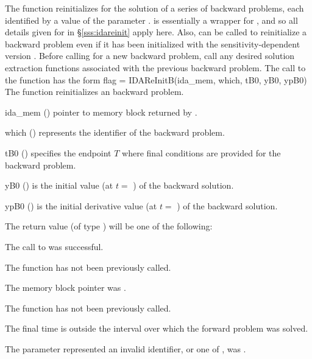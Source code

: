 The function  reinitializes {\idas} for the solution of a series
of backward problems, each identified by a value of the parameter .
 is essentially a wrapper for , and so all details
given for  in \S\ref{sss:idareinit} apply here.
Also,  can be called to reinitialize a backward problem even if it
has been initialized with the sensitivity-dependent version .
Before calling  for a new backward problem, call any
desired solution extraction functions  associated with the
previous backward problem.
The call to the  function has the form
{
  flag = IDAReInitB(ida\_mem, which, tB0, yB0, ypB0)
}
{
  The function  reinitializes an {\idas} backward problem.
}
{
  \begin{args}
  \item[ida\_mem] ()
    pointer to {\idas} memory block returned by .
  \item[which] ()
    represents the identifier of the backward problem.
  \item[tB0] ()
    specifies the endpoint $T$ where final conditions are provided for the 
    backward problem.
  \item[yB0] ()
    is the initial value (at $t =$ ) of the backward solution. 
  \item[ypB0] ()
    is the initial derivative value (at $t =$ ) of the backward solution. 
  \end{args}
}
{
  The return value  (of type ) will be one of the following:
  \begin{args}
  \item[\Id{IDA\_SUCCESS}]
    The call to  was successful.
  \item[\Id{IDA\_NO\_MALLOC}]
    The function  has not been previously called.
  \item[\Id{IDA\_MEM\_NULL}] 
    The  memory block pointer was .
  \item[\Id{IDA\_NO\_ADJ}]
    The function  has not been previously called.
  \item[\Id{IDA\_BAD\_TB0}]
    The final time  is outside the interval over which the forward problem
    was solved.
  \item[\Id{IDA\_ILL\_INPUT}]
    The parameter  represented an invalid identifier, or one
    of ,  was .
  \end{args}
}
{}

